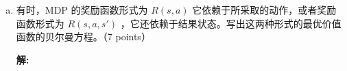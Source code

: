 \documentclass[8pt]{article}
\begin{document}
\begin{enumerate}[(a)]
\vspace{1em}



\item
有时，MDP 的奖励函数形式为 $R(s, a)$ 它依赖于所采取的动作，或者奖励函数形式为 $R(s, a, s')$ ，它还依赖于结果状态。写出这两种形式的最优价值函数的贝尔曼方程。（7 points）
        
\textbf{\large 解:}
\vspace{3em}



\end{enumerate}
\end{document}

